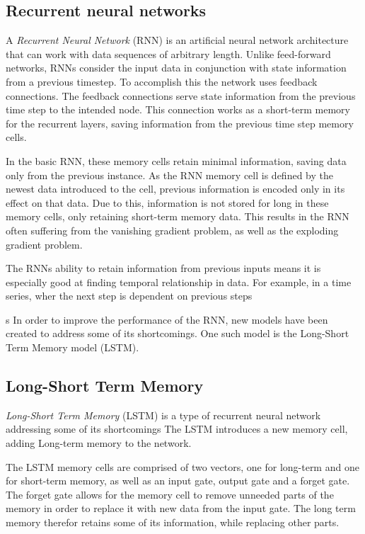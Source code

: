 
\subsection{Recurrent neural networks}

A \textit{Recurrent Neural Network} (RNN) is an artificial neural network architecture that can work with data sequences of arbitrary length.
Unlike feed-forward networks, RNNs consider the input data in conjunction with state information from a previous timestep.
To accomplish this the network uses feedback connections.
The feedback connections serve state information from the previous time step to the intended node.
This connection works as a short-term memory for the recurrent layers, saving information from the previous time step memory cells.

In the basic RNN, these memory cells retain minimal information, saving data only from the previous instance.
As the RNN memory cell is defined by the newest data introduced to the cell, previous information is encoded only in its effect on that data.
Due to this, information is not stored for long in these memory cells, only retaining short-term memory data.
This results in the RNN often suffering from the vanishing gradient problem, as well as the exploding gradient problem.

The RNNs ability to retain information from previous inputs means it is especially
good at finding temporal relationship in data. For example, in a time series, wher
the next step is dependent on previous steps

s
In order to improve the performance of the RNN, new models have been created to address some of its shortcomings.
One such model is the Long-Short Term Memory model (LSTM).


\cite[p.~469-472]{Geron2017}

\subsection{Long-Short Term Memory}

\textit{Long-Short Term Memory} (LSTM) is a type of recurrent neural network addressing some of its shortcomings
The LSTM introduces a new memory cell, adding Long-term memory to the network.

The LSTM memory cells are comprised of two vectors, one for long-term and one for short-term memory,
as well as an input gate, output gate and a forget gate.
The forget gate allows for the memory cell to remove unneeded parts of the memory in order to replace it with new data from the input gate.
The long term memory therefor retains some of its information, while replacing other parts.

